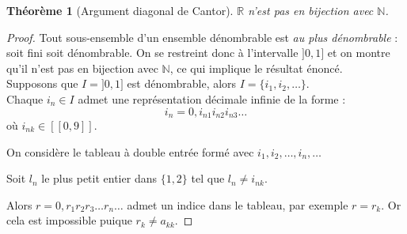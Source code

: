 \documentclass{article}
\theoremstyle{definition}
\theoremstyle{plain}
\newtheorem{theorem}[subsubsection]{Théorème}
\theoremstyle{plain}
\theoremstyle{plain}
\theoremstyle{plain}
\theoremstyle{plain}
\begin{document}
\begin{theorem}[Argument diagonal de Cantor]
	\( \mathbb{R} \) n'est pas en bijection avec \( \mathbb{N} \). \cite{aigner2018proofs} \cite{dehornoy2017théorie}
\end{theorem}
\begin{proof}
	Tout sous-ensemble d'un ensemble dénombrable est \textit{au plus dénombrable} : soit fini soit dénombrable. On se restreint donc à l'intervalle \( ]0,1] \) et on montre qu'il n'est pas en bijection avec \( \mathbb{N} \), ce qui implique le résultat énoncé. \\
	Supposons que \( I = ]0,1] \) est dénombrable, alors \( I = \{i_{1}, i_{2}, \ldots \} \). \\ 
	Chaque \( i_{n} \in I \) admet une représentation décimale infinie de la forme :
	\begin{equation*}
		i_{n} = 0,i_{n1}i_{n2}i_{n3}\ldots 
	\end{equation*}
	où \( i_{nk} \in [\![0,9]\!] \).

	On considère le tableau à double entrée formé avec \( i_{1}, i_{2}, \ldots, i_{n}, \ldots \) 

	Soit \( l_{n} \) le plus petit entier dans \( \{1,2\}\) tel que \( l_{n} \neq i_{nk}\). 

	Alors \( r = 0,r_{1}r_{2}r_{3} \ldots r_{n}\ldots \) admet un indice dans le tableau, par exemple \( r = r_{k} \). Or cela est impossible puique \( r_{k} \neq a_{kk} \).
	
\end{proof}
\end{document}
